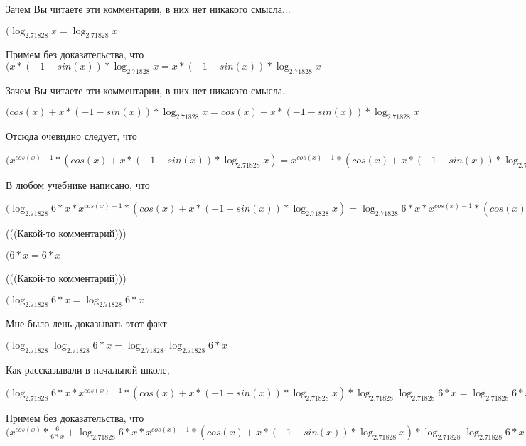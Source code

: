 \documentclass[12pt,a4paper,fleqn]{article}
\theoremstyle{definition}
\begin{document}
Зачем Вы читаете эти комментарии, в них нет никакого смысла...

$(\log_{ 2.71828 }{ x } = \log_{ 2.71828 }{ x }$

Примем без доказательства, что
$( x  * ( -1  - sin( x )) * \log_{ 2.71828 }{ x } =  x  * ( -1  - sin( x )) * \log_{ 2.71828 }{ x }$

Зачем Вы читаете эти комментарии, в них нет никакого смысла...

$(cos( x ) +  x  * ( -1  - sin( x )) * \log_{ 2.71828 }{ x } = cos( x ) +  x  * ( -1  - sin( x )) * \log_{ 2.71828 }{ x }$

Отсюда очевидно следует, что

$({ x }^{cos( x ) -  1 } * (cos( x ) +  x  * ( -1  - sin( x )) * \log_{ 2.71828 }{ x }) = { x }^{cos( x ) -  1 } * (cos( x ) +  x  * ( -1  - sin( x )) * \log_{ 2.71828 }{ x })$

В любом учебнике написано, что

$(\log_{ 2.71828 }{ 6  *  x } * { x }^{cos( x ) -  1 } * (cos( x ) +  x  * ( -1  - sin( x )) * \log_{ 2.71828 }{ x }) = \log_{ 2.71828 }{ 6  *  x } * { x }^{cos( x ) -  1 } * (cos( x ) +  x  * ( -1  - sin( x )) * \log_{ 2.71828 }{ x })$

(((Какой-то комментарий)))

$( 6  *  x  =  6  *  x $

(((Какой-то комментарий)))

$(\log_{ 2.71828 }{ 6  *  x } = \log_{ 2.71828 }{ 6  *  x }$

Мне было лень доказывать этот факт.

$(\log_{ 2.71828 }{\log_{ 2.71828 }{ 6  *  x }} = \log_{ 2.71828 }{\log_{ 2.71828 }{ 6  *  x }}$

Как рассказывали в начальной школе,

$(\log_{ 2.71828 }{ 6  *  x } * { x }^{cos( x ) -  1 } * (cos( x ) +  x  * ( -1  - sin( x )) * \log_{ 2.71828 }{ x }) * \log_{ 2.71828 }{\log_{ 2.71828 }{ 6  *  x }} = \log_{ 2.71828 }{ 6  *  x } * { x }^{cos( x ) -  1 } * (cos( x ) +  x  * ( -1  - sin( x )) * \log_{ 2.71828 }{ x }) * \log_{ 2.71828 }{\log_{ 2.71828 }{ 6  *  x }}$

Примем без доказательства, что
$({ x }^{cos( x )} * \frac{ 6 }{ 6  *  x }
 + \log_{ 2.71828 }{ 6  *  x } * { x }^{cos( x ) -  1 } * (cos( x ) +  x  * ( -1  - sin( x )) * \log_{ 2.71828 }{ x }) * \log_{ 2.71828 }{\log_{ 2.71828 }{ 6  *  x }} = { x }^{cos( x )} * \frac{ 6 }{ 6  *  x }
 + \log_{ 2.71828 }{ 6  *  x } * { x }^{cos( x ) -  1 } * (cos( x ) +  x  * ( -1  - sin( x )) * \log_{ 2.71828 }{ x }) * \log_{ 2.71828 }{\log_{ 2.71828 }{ 6  *  x }}$
\end{document}
